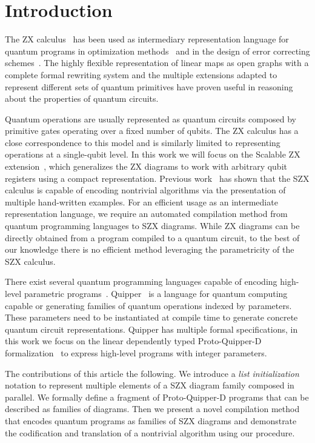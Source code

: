 \section{Introduction}%
\label{sec:introduction}

The ZX calculus~\cite{vdw_working_cs_zx} has been used as intermediary representation language
for quantum programs in optimization methods~\cite{DKPW2019qcircSimpl,borgna_hybrid_2021,Backens_2021}
and in the design of error correcting schemes~\cite{de_beaudrap_zx_2020}.
%
The highly flexible representation of linear maps as open graphs
with a complete formal rewriting system
and the multiple extensions adapted to represent
different sets of quantum primitives
have proven useful in reasoning about the properties of quantum circuits.

Quantum operations are usually represented as quantum circuits
composed by primitive gates operating over a fixed number of qubits.
The ZX calculus has a close correspondence to this model and is similarly 
limited to representing operations at a single-qubit level.
%
In this work we will focus on the Scalable ZX extension~\cite{carette_szx-calculus_2019},
which generalizes the ZX diagrams to work with arbitrary qubit registers
using a compact representation.
Previous work~\cite{carette_quantum_2021} has shown that the SZX calculus
is capable of encoding nontrivial algorithms
via the presentation of multiple hand-written examples.
For an efficient usage as an intermediate representation language,
we require an automated compilation method from quantum programming languages to SZX diagrams.
While ZX diagrams can be directly obtained from a program compiled to a quantum circuit,
to the best of our knowledge there is no efficient method leveraging the parametricity of the SZX calculus.

There exist several quantum programming languages capable of encoding
high-level parametric programs~\cite{qiskit,cirq,Steiger2018projectQ}.
Quipper~\cite{Green2013quipper} is a language for quantum computing
capable or generating families of quantum operations indexed by parameters.
These parameters need to be instantiated at compile time to generate
concrete quantum circuit representations.
Quipper has multiple formal specifications, in this work we focus on the
linear dependently typed Proto-Quipper-D formalization~\cite{fu_linear_2021,fu_tutorial_2020}
to express high-level programs with integer parameters.

The contributions of this article the following.
We introduce a \textit{list initialization} notation to represent multiple elements
of a SZX diagram family composed in parallel.
We formally define a fragment of Proto-Quipper-D programs that can be described as families of diagrams.
Then we present a novel compilation method that encodes quantum programs as families of SZX diagrams
and demonstrate the codification and translation of a nontrivial algorithm using our procedure.

